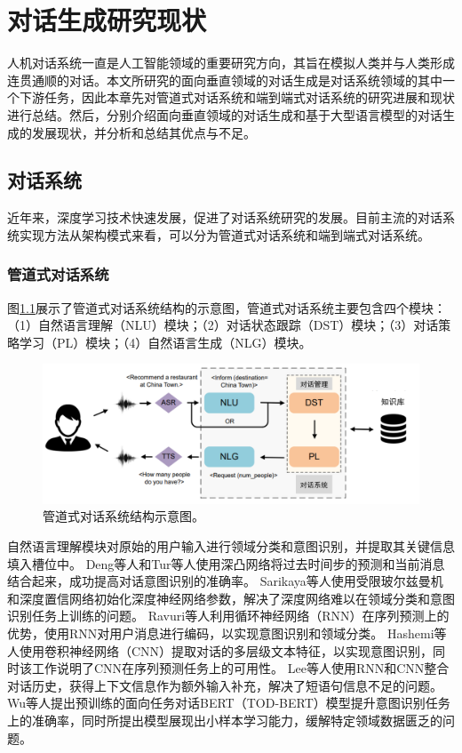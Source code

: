 \chapter{对话生成研究现状}

人机对话系统一直是人工智能领域的重要研究方向，其旨在模拟人类并与人类形成连贯通顺的对话。本文所研究的面向垂直领域的对话生成是对话系统领域的其中一个下游任务，因此本章先对管道式对话系统和端到端式对话系统的研究进展和现状进行总结。然后，分别介绍面向垂直领域的对话生成和基于大型语言模型的对话生成的发展现状，并分析和总结其优点与不足。

\section{对话系统}

近年来，深度学习技术快速发展，促进了对话系统研究的发展\cite{JSJX201907001}。目前主流的对话系统实现方法从架构模式来看，可以分为管道式对话系统和端到端式对话系统。

\subsection{管道式对话系统}

图\ref{pipeline_dialogue_system}展示了管道式对话系统结构的示意图，管道式对话系统主要包含四个模块：（1）自然语言理解（NLU）模块；（2）对话状态跟踪（DST）模块；（3）对话策略学习（PL）模块；（4）自然语言生成（NLG）模块。

\begin{figure}[htbp]
	\centering
	\includegraphics[scale=0.55]{Fig/pipeline_dialogue_system.png}
	\caption{\label{pipeline_dialogue_system}管道式对话系统结构示意图\cite{DBLP:journals/air/NiYPXC23}。}
\end{figure}

自然语言理解模块对原始的用户输入进行领域分类和意图识别，并提取其关键信息填入槽位中。
Deng等人\cite{DBLP:conf/slt/DengTHH12}和Tur等人\cite{DBLP:conf/icassp/TurDHH12}使用深凸网络将过去时间步的预测和当前消息结合起来，成功提高对话意图识别的准确率。
Sarikaya等人\cite{DBLP:journals/taslp/SarikayaHD14}使用受限玻尔兹曼机和深度置信网络初始化深度神经网络参数，解决了深度网络难以在领域分类和意图识别任务上训练的问题。
Ravuri等人\cite{DBLP:conf/interspeech/RavuriS15}利用循环神经网络（RNN）在序列预测上的优势，使用RNN对用户消息进行编码，以实现意图识别和领域分类。
Hashemi等人\cite{hashemi2016query}使用卷积神经网络（CNN）提取对话的多层级文本特征，以实现意图识别，同时该工作说明了CNN在序列预测任务上的可用性。
Lee等人\cite{DBLP:conf/naacl/LeeD16}使用RNN和CNN整合对话历史，获得上下文信息作为额外输入补充，解决了短语句信息不足的问题。
Wu等人\cite{DBLP:journals/corr/abs-2004-06871}提出预训练的面向任务对话BERT（TOD-BERT）模型提升意图识别任务上的准确率，同时所提出模型展现出小样本学习能力，缓解特定领域数据匮乏的问题。


